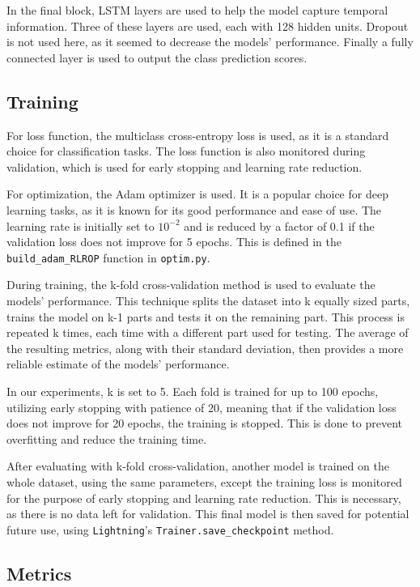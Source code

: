 \documentclass[english, he, bc, kiv, iso690alph]{fasthesis}
\begin{document}
In the final block, LSTM layers are used to help the model capture temporal information. Three of these layers are used, each with 128 hidden units. Dropout is not used here, as it seemed to decrease the models' performance. Finally a fully connected layer is used to output the class prediction scores.

\subsection{Training}

For loss function, the multiclass cross-entropy loss is used, as it is a standard choice for classification tasks. The loss function is also monitored during validation, which is used for early stopping and learning rate reduction.

For optimization, the Adam optimizer is used. It is a popular choice for deep learning tasks, as it is known for its good performance and ease of use. The learning rate is initially set to $10^{-2}$ and is reduced by a factor of 0.1 if the validation loss does not improve for 5 epochs. This is defined in the \texttt{build\_adam\_RLROP} function in \texttt{optim.py}.

During training, the k-fold cross-validation method is used to evaluate the models' performance. This technique splits the dataset into k equally sized parts, trains the model on k-1 parts and tests it on the remaining part. This process is repeated k times, each time with a different part used for testing. The average of the resulting metrics, along with their standard deviation, then provides a more reliable estimate of the models' performance.

In our experiments, k is set to 5. Each fold is trained for up to 100 epochs, utilizing early stopping with patience of 20, meaning that if the validation loss does not improve for 20 epochs, the training is stopped. This is done to prevent overfitting and reduce the training time.

After evaluating with k-fold cross-validation, another model is trained on the whole dataset, using the same parameters, except the training loss is monitored for the purpose of early stopping and learning rate reduction. This is necessary, as there is no data left for validation. This final model is then saved for potential future use, using \texttt{Lightning}'s \texttt{Trainer.save\_checkpoint} method.

\subsection{Metrics}
\end{document}
